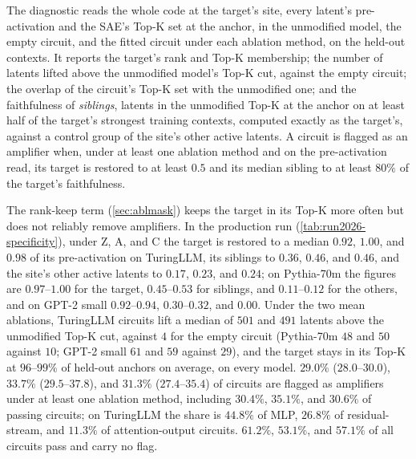 \documentclass[10pt]{article}
\begin{document}
The diagnostic reads the whole code at the target's site, every latent's pre-activation and the SAE's Top-K set at the anchor, in the unmodified model, the empty circuit, and the fitted circuit under each ablation method, on the held-out contexts.
It reports the target's rank and Top-K membership; the number of latents lifted above the unmodified model's Top-K cut, against the empty circuit; the overlap of the circuit's Top-K set with the unmodified one; and the faithfulness of \emph{siblings}, latents in the unmodified Top-K at the anchor on at least half of the target's strongest training contexts, computed exactly as the target's, against a control group of the site's other active latents.
A circuit is flagged as an amplifier when, under at least one ablation method and on the pre-activation read, its target is restored to at least $0.5$ and its median sibling to at least $80\%$ of the target's faithfulness.

The rank-keep term (\cref{sec:ablmask}) keeps the target in its Top-K more often but does not reliably remove amplifiers.
In the production run (\cref{tab:run2026-specificity}), under Z, A, and C the target is restored to a median $0.92$, $1.00$, and $0.98$ of its pre-activation on TuringLLM, its siblings to $0.36$, $0.46$, and $0.46$, and the site's other active latents to $0.17$, $0.23$, and $0.24$; on Pythia-70m the figures are $0.97$--$1.00$ for the target, $0.45$--$0.53$ for siblings, and $0.11$--$0.12$ for the others, and on GPT-2 small $0.92$--$0.94$, $0.30$--$0.32$, and $0.00$.
Under the two mean ablations, TuringLLM circuits lift a median of $501$ and $491$ latents above the unmodified Top-K cut, against $4$ for the empty circuit (Pythia-70m $48$ and $50$ against $10$; GPT-2 small $61$ and $59$ against $29$), and the target stays in its Top-K at $96$--$99\%$ of held-out anchors on average, on every model.
$29.0\%$ ($28.0$--$30.0$), $33.7\%$ ($29.5$--$37.8$), and $31.3\%$ ($27.4$--$35.4$) of circuits are flagged as amplifiers under at least one ablation method, including $30.4\%$, $35.1\%$, and $30.6\%$ of passing circuits; on TuringLLM the share is $44.8\%$ of MLP, $26.8\%$ of residual-stream, and $11.3\%$ of attention-output circuits.
$61.2\%$, $53.1\%$, and $57.1\%$ of all circuits pass and carry no flag.
\end{document}
